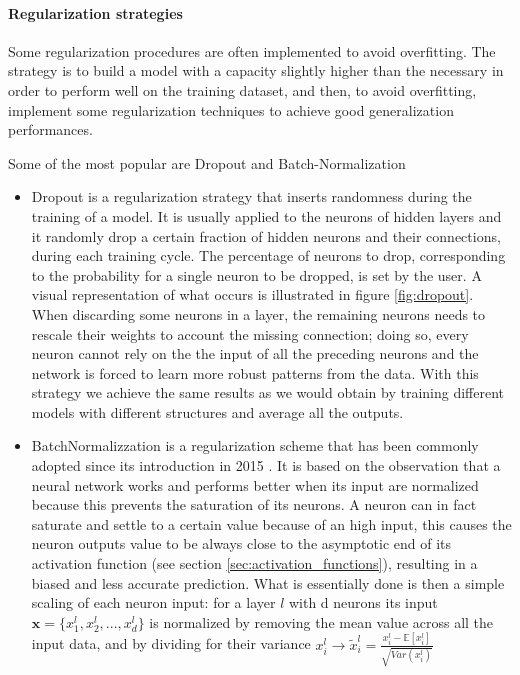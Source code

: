 \documentclass[11pt]{report}
\begin{document}
\paragraph{Regularization strategies} \hfill

\noindent Some regularization procedures are often implemented to avoid overfitting. The strategy is to build a model with a capacity slightly higher than the necessary in order to perform well on the training dataset, and then, to avoid overfitting, implement some regularization techniques to achieve good generalization performances.

Some of the most popular are Dropout and Batch-Normalization

\begin{itemize}
\item Dropout is a regularization strategy that inserts randomness during the training of a model.
It is usually applied to the neurons of hidden layers and it randomly drop a certain fraction of hidden neurons and their connections, during each training cycle.
The percentage of neurons to drop, corresponding to the probability for a single neuron to be dropped, is set by the user.
A visual representation of what occurs is illustrated in figure \ref{fig:dropout}.
When discarding some neurons in a layer, the remaining neurons needs to rescale their weights to account the missing connection; doing so, every neuron cannot rely on the the input of all the preceding neurons and the network is forced to learn more robust patterns from the data.
With this strategy we achieve the same results as we would obtain by training different models with different structures and average all the outputs.

\item BatchNormalizzation is a regularization scheme that has been commonly adopted since its introduction in 2015 \cite{ioffe2015}.
It is based on the observation that a neural network works and performs better when its input are normalized because this prevents the saturation of its neurons.
A neuron can in fact saturate and settle to a certain value because of an high input, this causes the neuron outputs value to be always close to the asymptotic end of its activation function (see section \ref{sec:activation_functions}), resulting in a biased and less accurate prediction.
What is essentially done is then a simple scaling of each neuron input: for a layer $l$ with d neurons its input $\mathbf{x} = \{x_1^l, x_2^l, ..., x_d^l\}$ is normalized by removing the mean value across all the input data, and by dividing for their variance $x_i^l \rightarrow \tilde x_i^l = \frac{x_i^{l} - \mathbb{E}[x_i^l]}{\sqrt{Var(x_i^l)}} $

\end{itemize}
\end{document}
